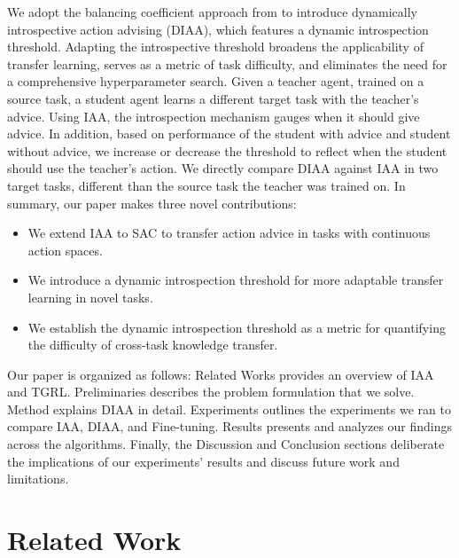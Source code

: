 \documentclass{article} %
\begin{document}
We adopt the balancing coefficient approach from \citet{shenfeld2023tgrl} to introduce dynamically introspective action advising (DIAA), which features a dynamic introspection threshold. Adapting the introspective threshold broadens the applicability of transfer learning, serves as a metric of task difficulty, and eliminates the need for a comprehensive hyperparameter search. Given a teacher agent, trained on a source task, a student agent learns a different target task with the teacher's advice. Using IAA, the introspection mechanism gauges when it should give advice. In addition, based on performance of the student with advice and student without advice, we increase or decrease the threshold to reflect when the student should use the teacher's action. We directly compare DIAA against IAA in two target tasks, different than the source task the teacher was trained on. In summary, our paper makes three novel contributions: 
\begin{itemize}
    \item We extend IAA to SAC to transfer action advice in tasks with continuous action spaces.
    \item We introduce a dynamic introspection threshold for more adaptable transfer learning in novel tasks.
    \item We establish the dynamic introspection threshold as a metric for quantifying the difficulty of cross-task knowledge transfer.
\end{itemize}
Our paper is organized as follows: Related Works provides an overview of IAA and TGRL. Preliminaries describes the problem formulation that we solve. Method explains DIAA in detail. Experiments outlines the experiments we ran to compare IAA, DIAA, and Fine-tuning. Results presents and analyzes our findings across the algorithms. Finally, the Discussion and Conclusion sections deliberate the implications of our experiments' results and discuss future work and limitations.

\section{Related Work}
\label{sec:related}
\end{document}
